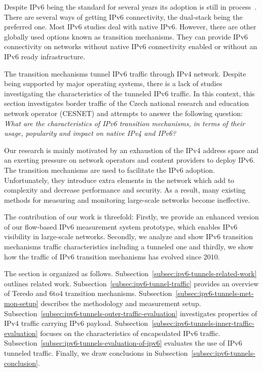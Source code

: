 Despite IPv6 being the standard for several years its adoption is still in process~\cite{Claffy-2011-Tracking}. There are several ways of getting IPv6 connectivity, the dual-stack being the preferred one. Most IPv6 studies deal with native IPv6. However, there are other globally used options known as transition mechanisms. They can provide IPv6 connectivity on networks without native IPv6 connectivity enabled or without an IPv6 ready infrastructure.

The transition mechanisms tunnel IPv6 traffic through IPv4 network. Despite being supported by major operating systems, there is a lack of studies investigating the characteristics of the tunneled IPv6 traffic. In this context, this section investigates border traffic of the Czech national research and education network operator (CESNET) and attempts to answer the following question: \emph{What are the characteristics of IPv6 transition mechanisms, in terms of their usage, popularity and impact on native IPv4 and IPv6?}

Our research is mainly motivated by an exhaustion of the IPv4 address space and an exerting pressure on network operators and content providers to deploy IPv6. The transition mechanisms are used to facilitate the IPv6 adoption. Unfortunately, they introduce extra elements in the network which add to complexity and decrease performance and security. As a result, many existing methods for measuring and monitoring large-scale networks become ineffective.

The contribution of our work is threefold: Firstly, we provide an enhanced version of our flow-based IPv6 measurement system prototype, which enables IPv6 visibility in large-scale networks. Secondly, we analyze and show IPv6 transition mechanisms traffic characteristics including a tunneled one and thirdly, we show how the traffic of IPv6 transition mechanisms has evolved since 2010.

The section is organized as follows. Subsection~\ref{subsec:ipv6-tunnels-related-work} outlines related work. Subsection~\ref{subsec:ipv6-tunnel-traffic} provides an overview of Teredo and 6to4 transition mechanisms. Subsection~\ref{subsec:ipv6-tunnels-met-mon-setup} describes the methodology and measurement setup. Subsection~\ref{subsec:ipv6-tunnels-outer-traffic-evaluation} investigates properties of IPv4 traffic carrying IPv6 payload. Subsection~\ref{subsec:ipv6-tunnels-inner-traffic-evaluation} focuses on the characteristics of encapsulated IPv6 traffic. Subsection~\ref{subsec:ipv6-tunnels-evaluation-of-ipv6} evaluates the use of IPv6 tunneled traffic. Finally, we draw conclusions in Subsection~\ref{subsec:ipv6-tunnels-conclusion}.

